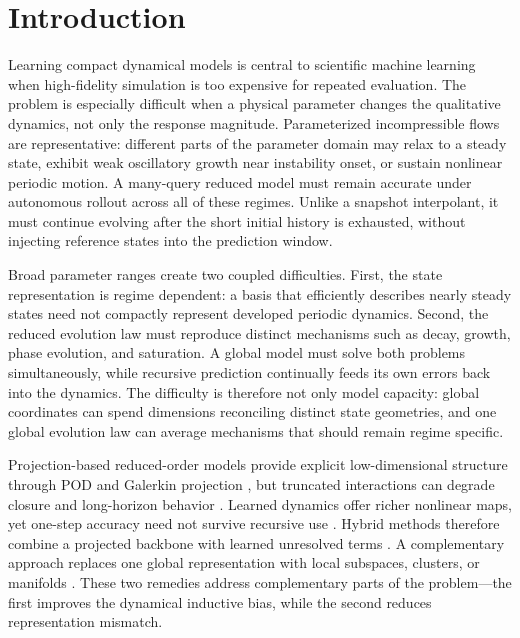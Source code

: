 \section{Introduction}

Learning compact dynamical models is central to scientific machine learning when
high-fidelity simulation is too expensive for repeated evaluation. The problem is
especially difficult when a physical parameter changes the qualitative dynamics, not
only the response magnitude. Parameterized incompressible flows are representative:
different parts of the parameter domain may relax to a steady state, exhibit weak
oscillatory growth near instability onset, or sustain nonlinear periodic motion. A
many-query reduced model must remain accurate under autonomous rollout across all of
these regimes. Unlike a snapshot interpolant, it must continue evolving after the short
initial history is exhausted, without injecting reference states into the prediction
window.

Broad parameter ranges create two coupled difficulties. First, the state representation
is regime dependent: a basis that efficiently describes nearly steady states need not
compactly represent developed periodic dynamics. Second, the reduced evolution law must
reproduce distinct mechanisms such as decay, growth, phase evolution, and saturation.
A global model must solve both problems simultaneously, while recursive prediction
continually feeds its own errors back into the dynamics. The difficulty is therefore not
only model capacity: global coordinates can spend dimensions reconciling distinct state
geometries, and one global evolution law can average mechanisms that should remain
regime specific.

Projection-based reduced-order models provide explicit low-dimensional structure through
POD and Galerkin projection \citep{sirovich1987,berkooz1993,benner2015}, but truncated
interactions can degrade closure and long-horizon behavior \citep{amsallem2012}.
Learned dynamics offer richer nonlinear maps, yet one-step accuracy need not survive
recursive use \citep{pathak2018,vlachas2018,duraisamy2019,brunton2020}. Hybrid methods
therefore combine a projected backbone with learned unresolved terms
\citep{dar2023,lee2020,fresca2022,geelen2023}. A complementary approach replaces one
global representation with local subspaces, clusters, or manifolds
\citep{kaiser2014,li2021cluster,diaz2024}. These two remedies address complementary
parts of the problem---the first improves the dynamical inductive bias, while the second
reduces representation mismatch.

